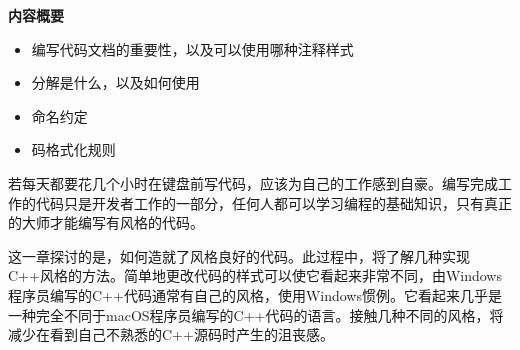 \noindent
\textbf{内容概要}

\begin{itemize}
\item
编写代码文档的重要性，以及可以使用哪种注释样式

\item
分解是什么，以及如何使用

\item
命名约定

\item
码格式化规则
\end{itemize}

若每天都要花几个小时在键盘前写代码，应该为自己的工作感到自豪。编写完成工作的代码只是开发者工作的一部分，任何人都可以学习编程的基础知识，只有真正的大师才能编写有风格的代码。

这一章探讨的是，如何造就了风格良好的代码。此过程中，将了解几种实现C++风格的方法。简单地更改代码的样式可以使它看起来非常不同，由Windows程序员编写的C++代码通常有自己的风格，使用Windows惯例。它看起来几乎是一种完全不同于macOS程序员编写的C++代码的语言。接触几种不同的风格，将减少在看到自己不熟悉的C++源码时产生的沮丧感。
